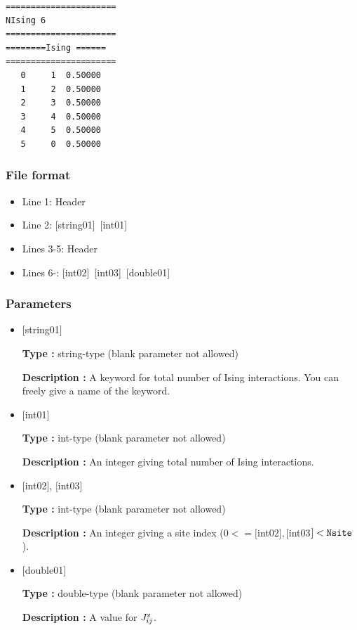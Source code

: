 \begin{minipage}{12.5cm}
\begin{screen}
\begin{verbatim}
====================== 
NIsing 6  
====================== 
========Ising ====== 
====================== 
   0     1  0.50000
   1     2  0.50000
   2     3  0.50000
   3     4  0.50000
   4     5  0.50000
   5     0  0.50000
\end{verbatim}
\end{screen}
\end{minipage}

\subsubsection{File format}
 \begin{itemize}
   \item  Line 1:  Header
   \item  Line 2:   [string01]~[int01]
   \item  Lines 3-5:  Header
   \item  Lines 6-: 
   [int02]~[int03]~[double01] 
  \end{itemize}
\subsubsection{Parameters}
 \begin{itemize}

   \item  $[$string01$]$
   
    {\bf Type :} string-type (blank parameter not allowed)

   {\bf Description :}  A keyword for total number of Ising interactions. You can freely give a name of the keyword.

   \item  $[$int01$]$
   
    {\bf Type :} int-type (blank parameter not allowed)

   {\bf Description :} An integer giving total number of Ising interactions.

  \item  $[$int02$]$, $[$int03$]$
  
 {\bf Type :} int-type (blank parameter not allowed)

{\bf Description :} An integer giving a site index ($0<= [$int02$], [$int03$]<\verb|Nsite|$).
 
 \item  $[$double01$]$
   
   {\bf Type :} double-type (blank parameter not allowed)

  {\bf Description :}   A value for $J_{ij}^{\rm z}$.
  
\end{itemize}

